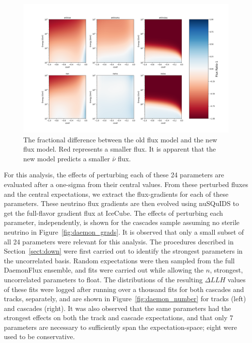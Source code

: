 \documentclass[main.tex]{subfiles}
\begin{document}
\begin{figure}
    \centering
    \includegraphics[width=0.8\linewidth]{figures/flux_plot_manyratio.png}
    \caption{The fractional difference between the old flux model and the new flux model. Red represents a smaller flux. It is apparent that the new model predicts a smaller $\bar{\nu}$ flux.}\label{fig:fractional_diff}
\end{figure}

For this analysis, the effects of perturbing each of these 24 parameters are evaluated after a one-sigma from their central values.
From these perturbed fluxes and the central expectations, we extract the flux-gradients for each of these parameters.
These neutrino flux gradients are then evolved using nuSQuIDS to get the full-flavor gradient flux at IceCube. 
The effects of perturbing each parameter, independently, is shown for the cascades sample assuming no sterile neutrino in Figure~\ref{fig:daemon_grads}.
It is observed that only a small subset of all 24 parameters were relevant for this analysis. 
The procedures described in Section~\ref{sect:down} were first carried out to identify the strongest parameters in the uncorrelated basis. 
Random expectations were then sampled from the full DaemonFlux ensemble, and fits were carried out while allowing the $n$, strongest, uncorrelated parameters to float. 
The distributions of the resulting $\Delta LLH$ values of these fits were logged after running over a thousand fits for both cascades and tracks, separately, and are shown in Figure~\ref{fig:daemon_number} for tracks (left) and cascades (right). 
It was also observed that the same parameters had the strongest effects on both the track and cascade expectations, and that only 7 parameters are necessary to sufficiently span the expectation-space; eight were used to be conservative. 

\end{document}
